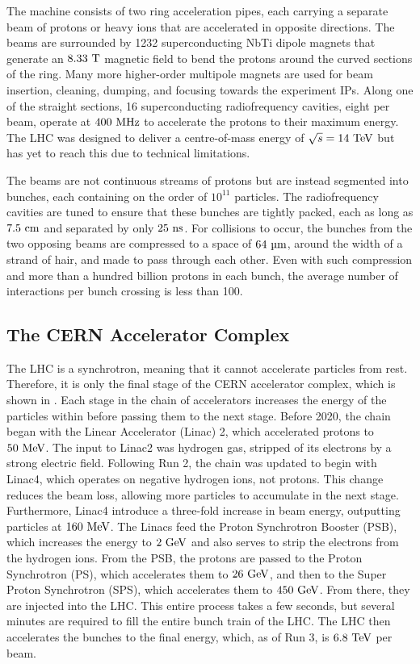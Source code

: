 The machine consists of two ring acceleration pipes, each carrying a separate beam of protons or heavy ions that are accelerated in opposite directions.
The beams are surrounded by 1232 superconducting NbTi dipole magnets that generate an $8.33~\tesla$ magnetic field to bend the protons around the curved sections of the ring.
Many more higher-order multipole magnets are used for beam insertion, cleaning, dumping, and focusing towards the experiment IPs.
Along one of the straight sections, 16 superconducting radiofrequency cavities, eight per beam, operate at $400~\MHz$ to accelerate the protons to their maximum energy.
The LHC was designed to deliver a centre-of-mass energy of $\sqrt{s}=14~\TeV$ but has yet to reach this due to technical limitations.

The beams are not continuous streams of protons but are instead segmented into bunches, each containing on the order of $10^{11}$ particles.
The radiofrequency cavities are tuned to ensure that these bunches are tightly packed, each as long as $7.5~\cm$ and separated by only $25~\ns$.
For collisions to occur, the bunches from the two opposing beams are compressed to a space of $64~\um$, around the width of a strand of hair, and made to pass through each other.
Even with such compression and more than a hundred billion protons in each bunch, the average number of interactions per bunch crossing \avemu is less than 100.

\subsection{The CERN Accelerator Complex}

The LHC is a synchrotron, meaning that it cannot accelerate particles from rest.
Therefore, it is only the final stage of the CERN accelerator complex, which is shown in .
Each stage in the chain of accelerators increases the energy of the particles within before passing them to the next stage.
Before 2020, the chain began with the Linear Accelerator (Linac) 2, which accelerated protons to $50~\MeV$.
The input to Linac2 was hydrogen gas, stripped of its electrons by a strong electric field.
Following Run 2, the chain was updated to begin with Linac4, which operates on negative hydrogen ions, not protons.
This change reduces the beam loss, allowing more particles to accumulate in the next stage.
Furthermore, Linac4 introduce a three-fold increase in beam energy, outputting particles at $160~\MeV$.
The Linacs feed the Proton Synchrotron Booster (PSB), which increases the energy to $2~\GeV$ and also serves to strip the electrons from the hydrogen ions.
From the PSB, the protons are passed to the Proton Synchrotron (PS), which accelerates them to $26~\GeV$, and then to the Super Proton Synchrotron (SPS), which accelerates them to $450~\GeV$.
From there, they are injected into the LHC.
This entire process takes a few seconds, but several minutes are required to fill the entire bunch train of the LHC.
The LHC then accelerates the bunches to the final energy, which, as of Run 3, is $6.8~\TeV$ per beam.

